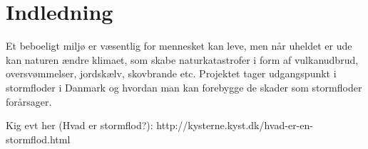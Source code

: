 \chapter{Indledning}\label{ch:indledning}
Et beboeligt miljø er væsentlig for mennesket kan leve, men når uheldet er ude kan naturen ændre klimaet, som skabe naturkatastrofer i form af vulkanudbrud, oversvømmelser, jordskælv, skovbrande etc. Projektet tager udgangspunkt i stormfloder i Danmark og hvordan man kan forebygge de skader som stormfloder forårsager.



Kig evt her (Hvad er stormflod?):
http://kysterne.kyst.dk/hvad-er-en-stormflod.html